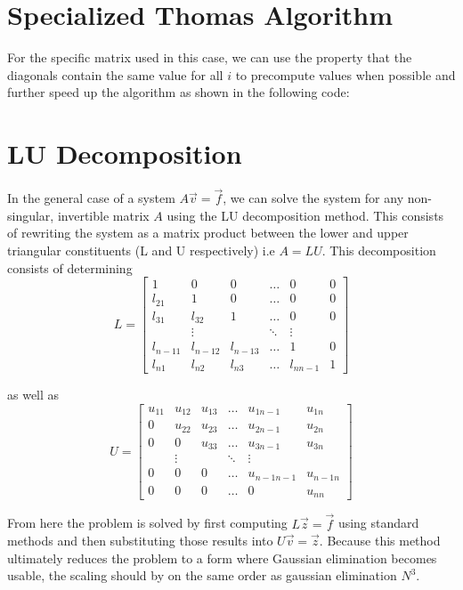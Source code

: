 \documentclass[10pt, a4paper]{amsart}
\begin{document}
\section{Specialized Thomas Algorithm}
For the specific matrix used in this case, we can use the property that the diagonals contain the same value for all $i$ to precompute values when possible and further speed up the algorithm as shown in the following code:



\section{LU Decomposition}
In the general case of a system $A\vec{v}=\vec{f}$, we can solve the system for any non-singular, invertible matrix $A$ using the LU decomposition method. This consists of rewriting the system as a matrix product between the lower and upper triangular constituents (L and U respectively) i.e $A=LU$. This decomposition consists of determining
\begin{equation}
L =
\begin{bmatrix}
1 & 0 & 0 & \dots & 0 & 0 \\
l_{21} & 1 & 0 & \dots & 0 & 0 \\
l_{31} & l_{32} & 1 & \dots & 0 & 0 \\
  &\vdots & & \ddots & \vdots  & \\
l_{n-11} & l_{n-12} & l_{n-13} & \dots & 1 & 0 \\  
l_{n1} & l_{n2} & l_{n3} & \dots & l_{nn-1} & 1
\end{bmatrix}
\end{equation}

as well as 
\begin{equation}
U = 
\begin{bmatrix}
u_{11} & u_{12} & u_{13} & \dots & u_{1n-1} & u_{1n} \\
0 & u_{22} & u_{23} & \dots & u_{2n-1} & u_{2n} \\
0 & 0 & u_{33} & \dots & u_{3n-1} & u_{3n} \\
  &\vdots & & \ddots & \vdots  & \\
0 & 0 & 0 & \dots & u_{n-1n-1} & u_{n-1n} \\  
0 & 0 & 0 & \dots & 0 & u_{nn}
\end{bmatrix}
\end{equation}

From here the problem is solved by first computing $L\vec{z}=\vec{f}$ using standard methods and then substituting those results into $U\vec{v}=\vec{z}$. Because this method ultimately reduces the problem to a form where Gaussian elimination becomes usable, the scaling should by on the same order as gaussian elimination $N^3$. 
\end{document}
